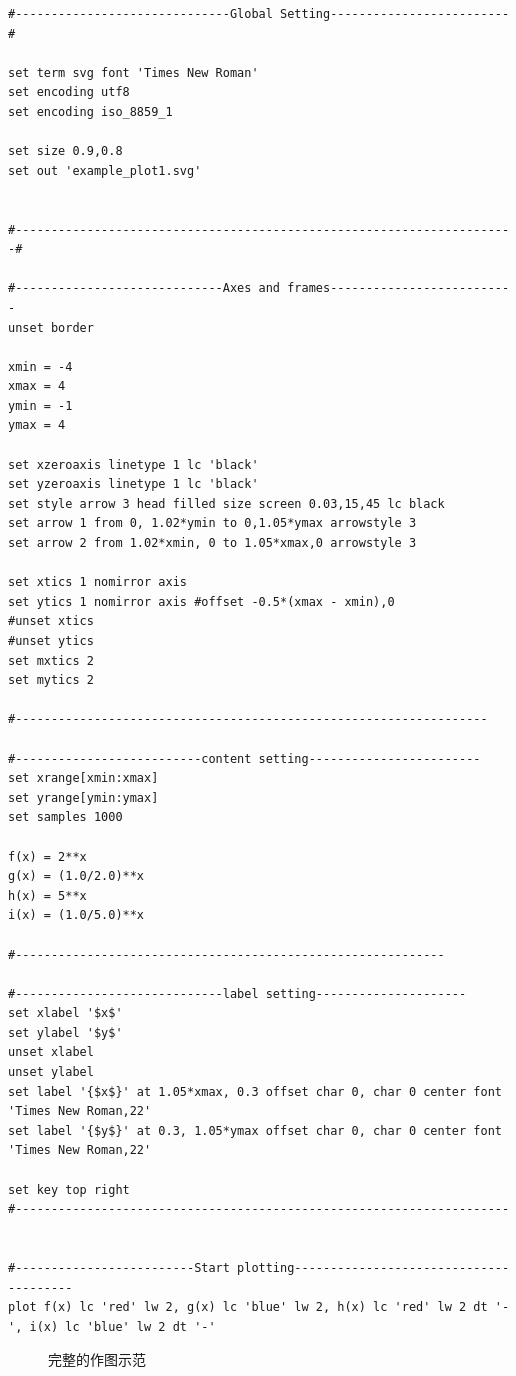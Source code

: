 \documentclass[cn,hazy,black,10pt,normal]{elegantnote}
\begin{document}
\begin{lstlisting}
#------------------------------Global Setting-------------------------#

set term svg font 'Times New Roman'
set encoding utf8
set encoding iso_8859_1

set size 0.9,0.8
set out 'example_plot1.svg'


#----------------------------------------------------------------------#

#-----------------------------Axes and frames--------------------------
unset border

xmin = -4
xmax = 4
ymin = -1
ymax = 4

set xzeroaxis linetype 1 lc 'black'
set yzeroaxis linetype 1 lc 'black'
set style arrow 3 head filled size screen 0.03,15,45 lc black
set arrow 1 from 0, 1.02*ymin to 0,1.05*ymax arrowstyle 3  
set arrow 2 from 1.02*xmin, 0 to 1.05*xmax,0 arrowstyle 3  

set xtics 1 nomirror axis
set ytics 1 nomirror axis #offset -0.5*(xmax - xmin),0
#unset xtics
#unset ytics
set mxtics 2
set mytics 2

#------------------------------------------------------------------

#--------------------------content setting------------------------
set xrange[xmin:xmax]
set yrange[ymin:ymax]
set samples 1000

f(x) = 2**x
g(x) = (1.0/2.0)**x
h(x) = 5**x
i(x) = (1.0/5.0)**x

#------------------------------------------------------------

#-----------------------------label setting---------------------
set xlabel '$x$'
set ylabel '$y$'
unset xlabel
unset ylabel
set label '{$x$}' at 1.05*xmax, 0.3 offset char 0, char 0 center font 'Times New Roman,22'
set label '{$y$}' at 0.3, 1.05*ymax offset char 0, char 0 center font 'Times New Roman,22'

set key top right
#---------------------------------------------------------------------


#-------------------------Start plotting---------------------------------------
plot f(x) lc 'red' lw 2, g(x) lc 'blue' lw 2, h(x) lc 'red' lw 2 dt '-', i(x) lc 'blue' lw 2 dt '-'

\end{lstlisting}

\begin{figure}[h!]
	\centering
	
	\caption{完整的作图示范}
\end{figure}
\end{document}
